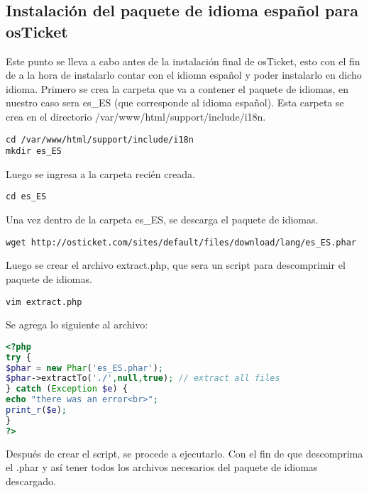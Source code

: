 \subsection{Instalación del paquete de idioma español para osTicket}
Este punto se lleva a cabo antes de la instalación final de osTicket, esto con el fin de a la hora de instalarlo contar con el idioma español y poder instalarlo en dicho idioma. Primero se crea la carpeta que va a contener el paquete de idiomas, en nuestro caso sera es\_ES (que corresponde al idioma español). Esta carpeta se crea en el directorio /var/www/html/support/include/i18n. 
\begin{lstlisting} 
cd /var/www/html/support/include/i18n
mkdir es_ES
\end{lstlisting}
Luego se ingresa a la carpeta recién creada. 
\begin{lstlisting} 
cd es_ES
\end{lstlisting}
Una vez dentro de la carpeta es\_ES, se descarga el paquete de idiomas.
\begin{lstlisting} 
wget http://osticket.com/sites/default/files/download/lang/es_ES.phar
\end{lstlisting}
Luego se crear el archivo extract.php, que sera un script para descomprimir el paquete de idiomas.  
\begin{lstlisting} 
vim extract.php
\end{lstlisting}
Se agrega lo siguiente al archivo:
\begin{lstlisting}[language=php] 
<?php 
try { 
$phar = new Phar('es_ES.phar'); 
$phar->extractTo('./',null,true); // extract all files 
} catch (Exception $e) { 
echo "there was an error<br>"; 
print_r($e); 
} 
?>  
\end{lstlisting}
Después de crear el script, se procede a ejecutarlo. Con el fin de que descomprima el .phar y así tener todos los archivos necesarios del paquete de idiomas descargado.
